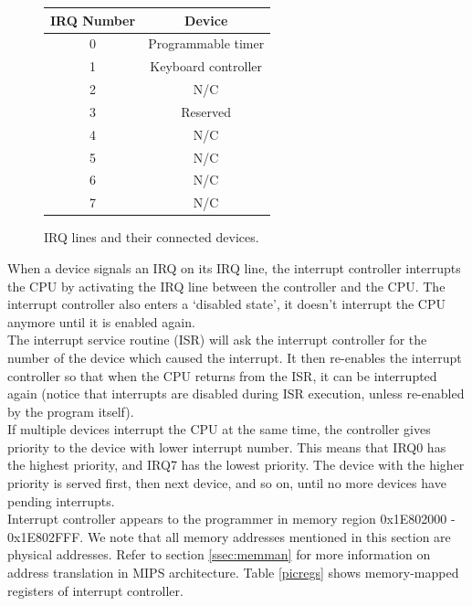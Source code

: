 \documentclass[oneside]{book}
\begin{document}
\begin{figure}[H]
\begin{center}
\begin{tabular}{|c|c|}

\hline \textbf{IRQ Number} & \textbf{Device} \\

\hline 0 & Programmable timer \\
\hline 1 & Keyboard controller \\
\hline 2 & N/C \\
\hline 3 & Reserved \\
\hline 4 & N/C \\
\hline 5 & N/C \\
\hline 6 & N/C \\
\hline 7 & N/C \\

\hline

\end{tabular}
\end{center}
\caption{IRQ lines and their connected devices.}
\label{irqlines}
\end{figure}

When a device signals an IRQ on its IRQ line, the interrupt controller
interrupts the CPU by activating the IRQ line between the controller
and the CPU. The interrupt controller also enters a `disabled state',
it doesn't interrupt the CPU anymore until it is enabled again.\\

The interrupt service routine (ISR) will ask the interrupt controller
for the number of the device which caused the interrupt. It then
re-enables the interrupt controller so that when the CPU returns
from the ISR, it can be interrupted again (notice that interrupts
are disabled during ISR execution, unless re-enabled by the program
itself).\\

If multiple devices interrupt the CPU at the same time, the controller
gives priority to the device with lower interrupt number. This means
that IRQ0 has the highest priority, and IRQ7 has the lowest priority.
The device with the higher priority is served first, then next device,
and so on, until no more devices have pending interrupts.\\

Interrupt controller appears to the programmer in memory region
0x1E802000 - 0x1E802FFF. We note that all memory addresses mentioned in this
section are physical addresses. Refer to section \ref{ssec:memman} for
more information on address translation in MIPS architecture. Table
\ref{picregs} shows memory-mapped registers of interrupt controller.\\
\end{document}
